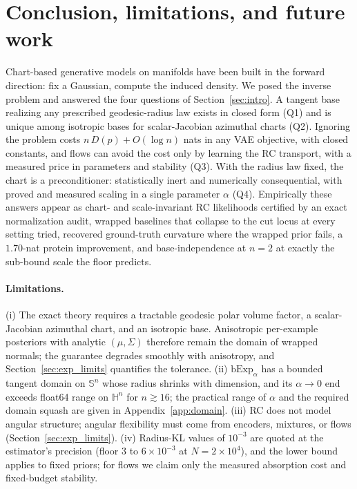 \documentclass{article}
\theoremstyle{definition}
\theoremstyle{remark}
\newcommand{\bExp}{\mathrm{bExp}}
\newcommand{\SSS}{\mathbb{S}}
\newcommand{\HH}{\mathbb{H}}
\begin{document}
\section{Conclusion, limitations, and future work}
\label{sec:conclusion}

Chart-based generative models on manifolds have been built in the forward direction: fix a Gaussian, compute the induced density. We posed the inverse problem and answered the four questions of Section~\ref{sec:intro}. A tangent base realizing any prescribed geodesic-radius law exists in closed form (Q1) and is unique among isotropic bases for scalar-Jacobian azimuthal charts (Q2). Ignoring the problem costs $n\,D(p)+O(\log n)$ nats in any VAE objective, with closed constants, and flows can avoid the cost only by learning the RC transport, with a measured price in parameters and stability (Q3). With the radius law fixed, the chart is a preconditioner: statistically inert and numerically consequential, with proved and measured scaling in a single parameter $\alpha$ (Q4). Empirically these answers appear as chart- and scale-invariant RC likelihoods certified by an exact normalization audit, wrapped baselines that collapse to the cut locus at every setting tried, recovered ground-truth curvature where the wrapped prior fails, a $1.70$-nat protein improvement, and base-independence at $n{=}2$ at exactly the sub-bound scale the floor predicts.

\paragraph{Limitations.} (i) The exact theory requires a tractable geodesic polar volume factor, a scalar-Jacobian azimuthal chart, and an isotropic base. Anisotropic per-example posteriors with analytic $(\mu,\Sigma)$ therefore remain the domain of wrapped normals; the guarantee degrades smoothly with anisotropy, and Section~\ref{sec:exp_limits} quantifies the tolerance. (ii) $\bExp_\alpha$ has a bounded tangent domain on $\SSS^n$ whose radius shrinks with dimension, and its $\alpha\to0$ end exceeds float64 range on $\HH^n$ for $n\gtrsim16$; the practical range of $\alpha$ and the required domain squash are given in Appendix~\ref{app:domain}. (iii) RC does not model angular structure; angular flexibility must come from encoders, mixtures, or flows (Section~\ref{sec:exp_limits}). (iv) Radius-KL values of $10^{-3}$ are quoted at the estimator's precision (floor $3$ to $6\times10^{-3}$ at $N{=}2\times10^4$), and the lower bound applies to fixed priors; for flows we claim only the measured absorption cost and fixed-budget stability.
\end{document}
